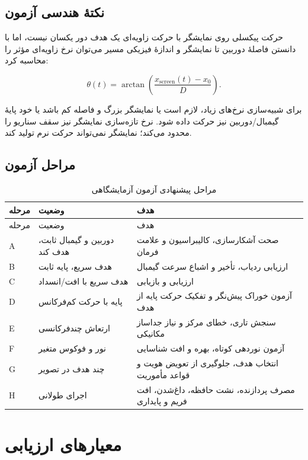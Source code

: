 \documentclass[12pt,a4paper]{article}
\newcommand{\EN}[1]{\lr{#1}}
\begin{document}
\subsection{نکتهٔ هندسی آزمون}

حرکت پیکسلی روی نمایشگر با حرکت زاویه‌ای یک هدف دور یکسان نیست، اما با دانستن فاصلهٔ دوربین تا نمایشگر و اندازهٔ فیزیکی مسیر می‌توان نرخ زاویه‌ای مؤثر را محاسبه کرد:

\begin{equation}
\theta(t)=\arctan\left(\frac{x_{\mathrm{screen}}(t)-x_0}{D}\right).
\end{equation}

برای شبیه‌سازی نرخ‌های زیاد، لازم است یا نمایشگر بزرگ و فاصله کم باشد یا خود پایهٔ گیمبال/دوربین نیز حرکت داده شود. نرخ تازه‌سازی نمایشگر نیز سقف سناریو را محدود می‌کند؛ نمایشگر \EN{60 Hz} نمی‌تواند حرکت نرم \EN{120 Hz} تولید کند.

\subsection{مراحل آزمون}

\begin{longtable}{p{1.1cm}p{4cm}p{9.2cm}}
\caption{مراحل پیشنهادی آزمون آزمایشگاهی}\label{tab:teststages}\\
\toprule
مرحله & وضعیت & هدف \\
\midrule
\endfirsthead
\toprule
مرحله & وضعیت & هدف \\
\midrule
\endhead
A & دوربین و گیمبال ثابت، هدف کند & صحت آشکارسازی، کالیبراسیون و علامت فرمان \\
B & هدف سریع، پایه ثابت & ارزیابی ردیاب، تأخیر و اشباع سرعت گیمبال \\
C & هدف سریع با افت/انسداد & ارزیابی \EN{COAST} و بازیابی \\
D & پایه با حرکت کم‌فرکانس & آزمون خوراک پیش‌نگر \EN{IMU} و تفکیک حرکت پایه از هدف \\
E & ارتعاش چندفرکانسی & سنجش تاری، خطای مرکز و نیاز جداساز مکانیکی \\
F & نور و فوکوس متغیر & آزمون نوردهی کوتاه، بهره و افت شناسایی \\
G & چند هدف در تصویر & انتخاب هدف، جلوگیری از تعویض هویت و قواعد مأموریت \\
H & اجرای طولانی & مصرف پردازنده، نشت حافظه، داغ‌شدن، افت فریم و پایداری \\
\bottomrule
\end{longtable}

\section{معیارهای ارزیابی}
\end{document}
